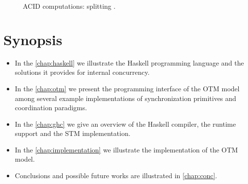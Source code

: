 \begin{figure}
    \centering
    \caption{ACID computations: splitting .}
    \label{fig:acid-spectrum}
\end{figure}

\section{Synopsis}
\begin{itemize}
\item In the \cref{chap:haskell} we illustrate the Haskell programming language and the solutions it provides for internal concurrency.

\item In the \cref{chap:otm} we present the programming interface of the OTM model among several example implementations of synchronization primitives and coordination paradigms.

\item In the \cref{chap:ghc} we give an overview of the Haskell compiler, the runtime support and the STM implementation.

\item In the \cref{chap:implementation} we illustrate the implementation of the OTM model.

\item Conclusions and possible future works are illustrated in \cref{chap:conc}.
\end{itemize}
